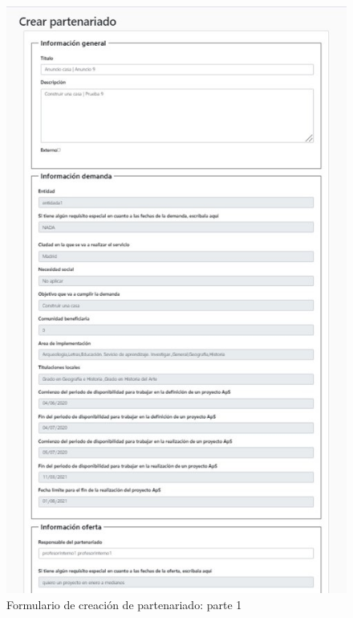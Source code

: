\documentclass[11pt]{book}
\begin{document}
	
	\begin{figure}[t]
		\centering
		\includegraphics[scale=1.1]{partenariado1}
		\caption{Formulario de creación de partenariado: parte 1}
	\end{figure}
	
\end{document}
